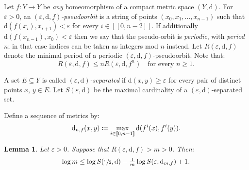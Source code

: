 \documentclass[10pt]{amsart}
\newcommand{\ldbrack}{[\![}
\newcommand{\rdbrack}{]\!]}
\def\vcentcolon{\mathrel{\mathop\ordinarycolon}}
\providecommand\ordinarycolon{:}
\providecommand*\coloneqq{\vcentcolon\mathrel{\mkern-1.2mu}=}
\theoremstyle{plain}
\newtheorem{lemma}[theorem]{Lemma}
\theoremstyle{definition}
\newcommand{\dd}{\mathrm{d}}
\let\epsilon\varepsilon
\begin{document}
Let $f \colon Y \to Y$ be \emph{any} homeomorphism of a compact metric space $(Y,\dd)$.
For $\epsilon>0$, an \emph{$(\epsilon, \dd, f)$-pseudoorbit} is a string of points $(x_0,x_1, \dots, x_{n-1})$ such that
$\dd(f(x_i), x_{i+1})< \epsilon$ for every $i \in \ldbrack 0, n-2\rdbrack$.
If additionally $\dd(f (x_{n-1}), x_0)< \epsilon$ then we say that the pseudo-orbit is \emph{periodic}, with \emph{period} $n$; in that case indices can be taken as integers mod $n$ instead.
Let $R(\epsilon, \dd, f)$ denote the minimal period of a periodic $(\epsilon, \dd, f)$-pseudoorbit.
Note that:
\begin{equation}\label{e.R_power}
R(\epsilon, \dd, f) \le n R(\epsilon, \dd, f^n) \quad \text{for every $n \ge 1$.}
\end{equation}

A set $E \subseteq Y$ is called \emph{$(\epsilon, \dd)$-separated} if $\dd(x,y)\ge \epsilon$ for every pair of distinct points $x$, $y\in E$.
Let $S(\epsilon,\dd)$ be the maximal cardinality of a $(\epsilon, \dd)$-separated set.

Define a sequence of metrics by:
\[
\dd_{n,f}(x,y) \coloneqq \max_{i \in \ldbrack 0, n-1\rdbrack} \dd(f^i(x), f^i(y)).
\]

\begin{lemma}\label{l.BQ_estimate}
Let $\epsilon>0$.
Suppose that $R(\epsilon,\dd,f) > m > 0$.
Then:
\[
\log m \le \log S(\sfrac{\epsilon}{2}, \dd) - \tfrac{1}{m} \log S(\epsilon, \dd_{m,f}) + 1.
\]
\end{lemma}
\end{document}
